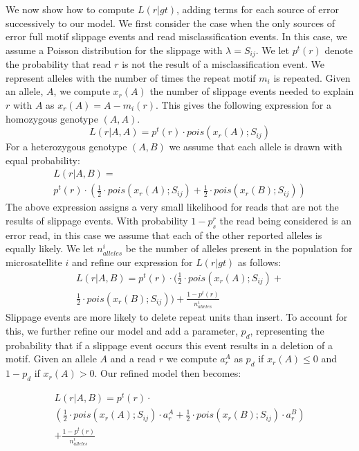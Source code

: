 \documentclass{bioinfo}
\begin{document}
\begin{methods}
We now show how to compute $L(r|gt)$, adding terms for each source of error successively to our model.
We first consider the case when the only sources of error full motif slippage events and read misclassification events.
In this case, we assume a Poisson distribution for the slippage with $\lambda = S_{ij}$.  We let $p^t(r)$ denote the probability that read $r$ 
is not the result of a misclassification event.  We represent alleles with the number of times the repeat motif $m_i$ is repeated.  
Given an allele, $A$, we compute $x_r(A)$ the number of slippage events needed to explain $r$ with $A$ as $x_r(A) = A-m_i(r)$.
This gives the following expression for a homozygous genotype $(A,A)$.
\begin{equation}
L(r|A,A) = p^t(r) \cdot pois(x_r(A);S_{ij})
\label{eq:likelihood}
\end{equation}
For a heterozygous genotype $(A,B)$ we assume that each allele is drawn with equal probability:
\begin{multline}
L(r|A,B) = \\
p^t(r) \cdot 
(\frac{1}{2} \cdot pois(x_r(A);S_{ij})+ \frac{1}{2} \cdot pois(x_r(B);S_{ij}))
\end{multline}
The above expression assigns a very small likelihood for reads that are not the results of slippage events.  With probability $1-p_s^r$ the read being considered is an error read, in this case we assume 
that each of the other reported alleles is equally likely. We let $n^i_{alleles}$ 
be the number of alleles present in the population for microsatellite $i$ and refine our expression for $L(r|gt)$ as follows:
\begin{multline}
L(r|A,B) = p^t(r) \cdot (\frac{1}{2} \cdot pois(x_r(A);S_{ij})+ \\
\frac{1}{2} \cdot pois(x_r(B);S_{ij})) + \frac{1-p^t(r)}{n^i_{alleles}}
\end{multline}
Slippage events are more likely to delete repeat units than insert.  To account for this, we further refine our model and add a parameter, $p_d$, representing the probability 
that if a slippage event occurs this event results in a deletion of a motif.  Given an allele $A$ and a read $r$ we compute $a_r^A$ as $p_d$ if $x_r(A) \le 0$ and $1-p_d$ if $x_r(A) > 0$.  
Our refined model then becomes:


\begin{multline}
L(r|A,B) = p^t(r) \cdot \\
(\frac{1}{2} \cdot pois(x_r(A);S_{ij}) \cdot a_r^A+ \frac{1}{2} \cdot pois(x_r(B);S_{ij})\cdot a_r^B)\\
+ \frac{1-p^t(r)}{n^i_{alleles}}
\label{eq:likelihood3.5}
\end{multline}


\end{methods}
\end{document}

